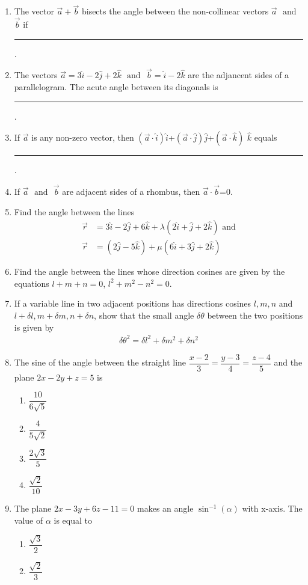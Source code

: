 \begin{enumerate}[label=\thesubsection.\arabic*,ref=\thesubsection.\theenumi]
\item The vector $\vec{a}+\vec{b}$ bisects the angle between the non-collinear vectors $\vec{a}$ $\text{ and }$ $\vec{b}$ if \rule{1cm}{0.15mm}.
\item The vectors $\vec{a}=3\hat{i}-2\hat{j}+2\hat{k}$ $\text{ and }$ $\vec{b}=\hat{i}-2\hat{k}$ are the adjancent sides of a parallelogram. The acute angle between its diagonals is \rule{1cm}{0.15mm}.
\item If $\vec{a}$ is  any non-zero vector, then $(\vec{a}\cdot \hat{i})\hat{i}$+$(\vec{a}\cdot \hat{j})\hat{j}$+$(\vec{a}\cdot \hat{k})$ $\hat{k}$ equals \rule{1cm}{0.15mm}.
\item If $\vec{a}$ $\text{ and }$ $\vec{b}$ are adjacent sides of a rhombus, then $\vec{a}\cdot \vec{b}$=0.
\item Find the angle between the lines 
\begin{align}
	\overrightarrow{r}&=3\hat{i}-2\hat{j}+6\hat{k}+\lambda(2\hat{i}+\hat{j}+2\hat{k})
	\text{ and}
	\\
	\overrightarrow{r}&=(2\hat{j}-5\hat{k})+\mu(6\hat{i}+3\hat{j}+2\hat{k})
\end{align}
%
\item Find the angle between the lines whose direction cosines are given by the equations $l+m+n=0$, $l^2+m^2-n^2=0$.
\item If a variable line in two adjacent positions has directions cosines $l, m, n$ and $l+\delta l, m+\delta m, n+\delta n$, show that the small angle $\delta\theta$ between the two positions is given by 
\begin{align}
	\delta\theta^2=\delta l^2+\delta m^2+\delta n^2
\end{align}
\item The sine of the angle between the straight line $\dfrac{x-2}{3}=\dfrac{y-3}{4}=\dfrac{z-4}{5}$ and the plane $2x-2y+z=5$ is
\begin{enumerate}
	\item $\dfrac{10}{6\sqrt{5}}$ 
	\item $\dfrac{4}{5\sqrt{2}}$
	\item $\dfrac{2\sqrt{3}}{5}$
	\item $\dfrac{\sqrt{2}}{10}$
\end{enumerate}
\item The plane $2x-3y+6z-11=0$ makes an angle $\sin^{-1}(\alpha)$ with x-axis. The value of $\alpha$ is equal to 
\begin{enumerate}
	\item  $\dfrac{\sqrt{3}}{2}$
	\item  $\dfrac{\sqrt{2}}{3}$

\end{enumerate}
\end{enumerate}
